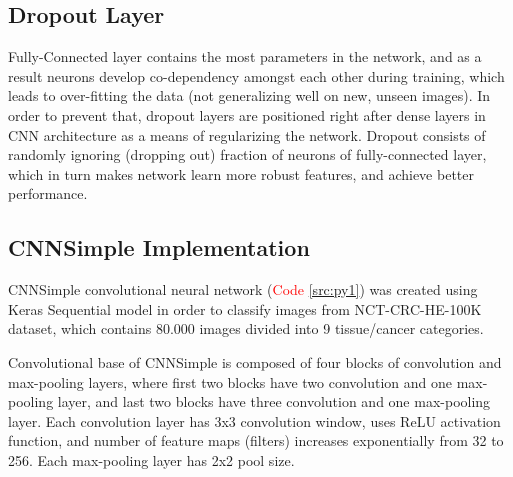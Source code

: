 \subsection{Dropout Layer}

Fully-Connected layer contains the most parameters in the network, and as a result neurons develop co-dependency amongst each other during training, which leads to over-fitting the data (not generalizing well on new, unseen images). In order to prevent that, dropout layers are positioned right after dense layers in CNN architecture as a means of regularizing the network. Dropout consists of randomly ignoring (dropping out) fraction of neurons of fully-connected layer, which in turn makes network learn more robust features, and achieve better performance.
\clearpage

\subsection{CNNSimple Implementation}

CNNSimple convolutional neural network (\textcolor{red}{Code \ref{src:py1}}) was created using Keras Sequential model in order to classify images from NCT-CRC-HE-100K dataset, which contains 80.000 images divided into 9 tissue/cancer categories. 

Convolutional base of CNNSimple is composed of four blocks of convolution and max-pooling layers, where first two blocks have two convolution and one max-pooling layer, and last two blocks have three convolution and one max-pooling layer. Each convolution layer has 3x3 convolution window, uses ReLU activation function, and number of feature maps (filters) increases exponentially from 32 to 256. Each max-pooling layer has 2x2 pool size. 

